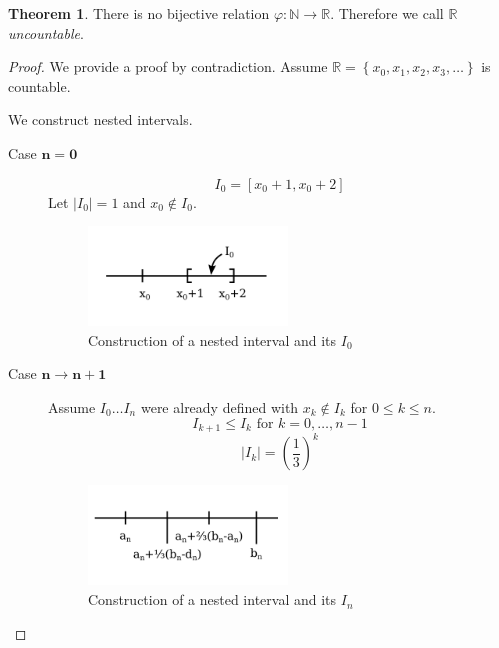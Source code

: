 \documentclass[a4paper,landscape,twocolumn]{article}
\theoremstyle{definition}
\newtheorem{theorem}{Theorem}
\newcommand\set[1]{\left\{#1\right\}}
\newcommand\abs[1]{\left|#1\right|}
\begin{document}
\begin{theorem}
  There is no bijective relation $\varphi: \mathbb N \rightarrow \mathbb R$.
  Therefore we call $\mathbb R$ \emph{uncountable}.
\end{theorem}

\begin{proof}
  We provide a proof by contradiction.
  Assume $\mathbb R = \set{x_0, x_1, x_2, x_3, \ldots}$ is countable.

  We construct nested intervals.
  \begin{description}
    \item[Case $\mathbf{n = 0}$]
      \[ I_0 = \left[x_0 + 1, x_0 + 2\right] \]
      Let $\abs{I_0} = 1$ and $x_0 \not\in I_0$.

      \begin{figure}[!t]
        \begin{center}
          \includegraphics[width=200px]{img/interval_I0.pdf}
          \caption{Construction of a nested interval and its $I_0$}
        \end{center}
      \end{figure}

    \item[Case $\mathbf{n \rightarrow n + 1}$]
      Assume $I_{0} \dots I_n$ were already defined with $x_k \notin I_k$ for $0 \leq k \leq n$.
      \[ I_{k+1} \leq I_k \text{ for } k = 0, \dots, n-1 \]
      \[ \abs{I_k} = \left(\frac13\right)^k \]

      \begin{figure}[!t]
        \begin{center}
          \includegraphics[width=200px]{img/interval_In.pdf}
          \caption{Construction of a nested interval and its $I_n$}
        \end{center}
      \end{figure}


\end{description}
\end{proof}
\end{document}
